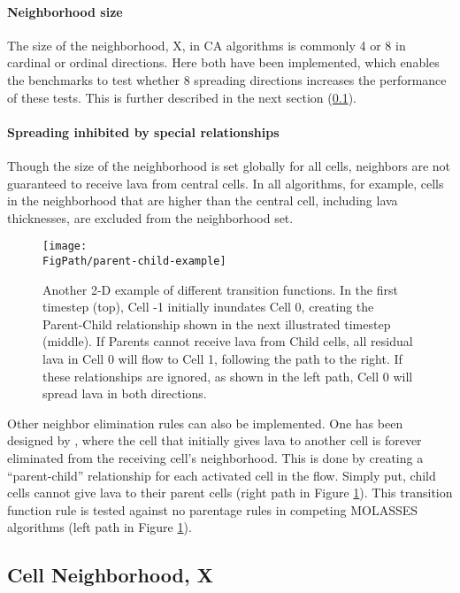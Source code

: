 		\paragraph{Neighborhood size} The size of the neighborhood, X, in CA algorithms is commonly 4 or 8 in cardinal or ordinal directions. Here both have been implemented, which enables the benchmarks to test whether 8 spreading directions increases the performance of these tests. This is further described in the next section (\ref{sec_X}).

		\paragraph{Spreading inhibited by special relationships} Though the size of the neighborhood is set globally for all cells, neighbors are not guaranteed to receive lava from central cells. In all algorithms, for example, cells in the neighborhood that are higher than the central cell, including lava thicknesses, are excluded from the neighborhood set.
		
		\begin{figure}[!h]
			\centering
			\texttt{[image: \\FigPath/parent-child-example]}
			\caption[A 2-D example of different transition functions with different ``parentage'' rules]{Another 2-D example of different transition functions. In the first timestep (top), Cell -1 initially inundates Cell 0, creating the Parent-Child relationship shown in the next illustrated timestep (middle). If Parents cannot receive lava from Child cells, all residual lava in Cell 0 will flow to Cell 1, following the path to the right. If these relationships are ignored, as shown in the left path, Cell 0 will spread lava in both directions.}
			\label{fig_ParentTrap}
		\end{figure}
		
		Other neighbor elimination rules can also be implemented. One has been designed by \citet{connor2012}, where the cell that initially gives lava to another cell is forever eliminated from the receiving cell's neighborhood. This is done by creating a ``parent-child'' relationship for each activated cell in the flow. Simply put, child cells cannot give lava to their parent cells (right path in Figure \ref{fig_ParentTrap}). This transition function rule is tested against no parentage rules in competing MOLASSES algorithms (left path in Figure \ref{fig_ParentTrap}).
		
	\subsection{Cell Neighborhood, X}\label{sec_X}
	
